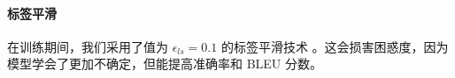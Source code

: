


\paragraph{标签平滑}
在训练期间，我们采用了值为 $\epsilon_{ls}=0.1$ 的标签平滑技术 \citep{DBLP:journals/corr/SzegedyVISW15}。这会损害困惑度，因为模型学会了更加不确定，但能提高准确率和 BLEU 分数。
